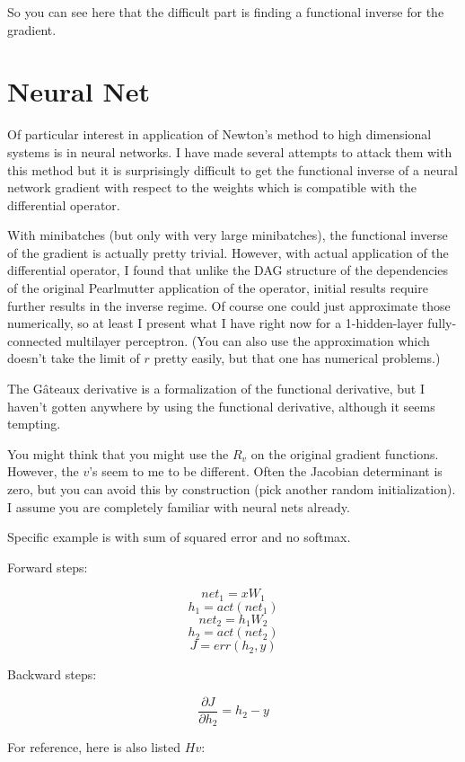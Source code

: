 \documentclass{article}
\begin{document}
So you can see here that the difficult part is finding a functional inverse for the gradient.

\section{Neural Net}

Of particular interest in application of Newton's method to high dimensional systems is in neural networks. I have made several attempts to attack them with this method but it is surprisingly difficult to get the functional inverse of a neural network gradient with respect to the weights which is compatible with the differential operator.

With minibatches (but only with very large minibatches), the functional inverse of the gradient is actually pretty trivial. However, with actual application of the differential operator, I found that unlike the DAG structure of the dependencies of the original Pearlmutter application of the operator, initial results require further results in the inverse regime. Of course one could just approximate those numerically, so at least I present what I have right now for a 1-hidden-layer fully-connected multilayer perceptron. (You can also use the approximation which doesn't take the limit of $r$ pretty easily, but that one has numerical problems.)

The G\^{a}teaux derivative is a formalization of the functional derivative, but I haven't gotten anywhere by using the functional derivative, although it seems tempting.

You might think that you might use the $R_v$ on the original gradient functions. However, the $v$'s seem to me to be different. Often the Jacobian determinant is zero, but you can avoid this by construction (pick another random initialization). I assume you are completely familiar with neural nets already\cite{deeplearning}.

Specific example is with sum of squared error and no softmax.

Forward steps:

$$ net_1 = xW_1 $$
$$ h_1 = act(net_1) $$
$$ net_2 = h_1W_2 $$
$$ h_2 = act(net_2) $$
$$ J = err(h_2, y) $$

Backward steps:

$$ \frac{\partial J}{\partial h_2} = h_2 - y $$

For reference, here is also listed $Hv$:

\end{document}

